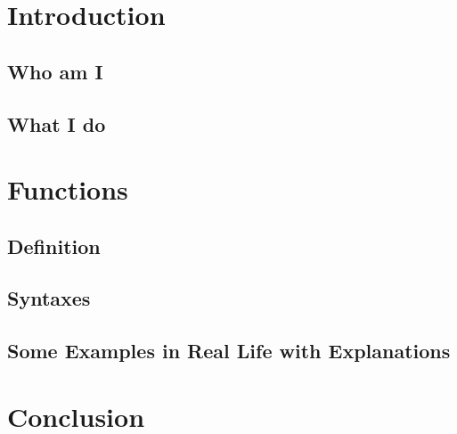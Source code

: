 \documentclass{book}
\begin{document}
\chapter{Introduction}
\section{Who am I}
\Blindtext[6]
\section{What I do}
\Blindtext[6]



\chapter{Functions}
\section{Definition}
\Blindtext[5]
\section{Syntaxes}
\Blindtext[2]
\section{Some Examples in Real Life with Explanations}
\Blindtext[17]



\chapter{Conclusion}
\Blindtext[6]
\end{document}
